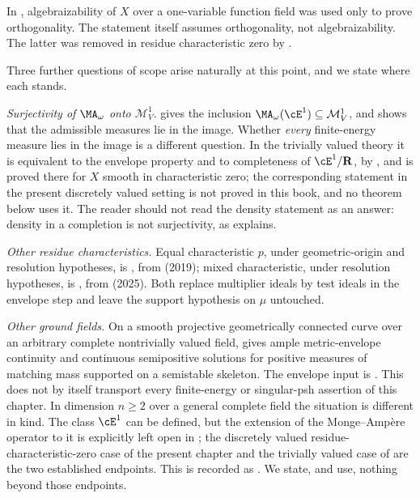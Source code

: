 In \cite{BFJ15}, algebraizability of \(X\) over a one-variable function
field was used only to prove orthogonality.  The statement
 itself assumes orthogonality, not
algebraizability.  The latter was removed in residue characteristic zero by
\cite[Theorem~6.3.3 and Corollary~6.3.4]{BGGJKM20}.

Three further questions of scope arise naturally at this point, and we state
where each stands.

\emph{Surjectivity of \(\MA_\omega\) onto \(\mathcal M^1_V\).}
 gives the inclusion
\(\MA_\omega(\cE^1)\subseteq\mathcal M^1_V\), and
 shows that the admissible measures lie
in the image.  Whether \emph{every} finite-energy measure lies in the image
is a different question.  In the trivially valued theory it is equivalent to
the envelope property and to completeness of \(\cE^1/\mathbf R\), by
\cite[Theorem~12.8]{BJ22}, and is proved there for \(X\) smooth in
characteristic zero; the corresponding statement in the present discretely
valued setting is not proved in this book, and no theorem below uses it.
The reader should not read the density statement
 as an answer: density in a
completion is not surjectivity, as
 explains.

\emph{Other residue characteristics.}  Equal characteristic \(p\), under
geometric-origin and resolution hypotheses, is
, from \cite{GJKM19} (2019);
mixed characteristic, under resolution hypotheses, is
, from \cite{FGK25} (2025).  Both
replace multiplier ideals by test ideals in the envelope step and leave the
support hypothesis on \(\mu\) untouched.

\emph{Other ground fields.}  On a smooth projective geometrically
connected curve over an arbitrary complete nontrivially valued field,
 gives ample metric-envelope
continuity and continuous semipositive solutions for positive measures of
matching mass supported on a semistable skeleton.  The envelope input is
\cite[Theorem~1.1]{GJKM19}.  This does not by itself transport every
finite-energy or singular-psh assertion of this chapter.
In dimension \(n\geq2\) over a
general complete field the situation is different in kind.  The class
\(\cE^1\) can be defined, but the extension of the Monge--Amp\`ere operator
to it is explicitly left open in \cite[Remark~4.4]{PS23Hybrid}; the
discretely valued residue-characteristic-zero case of the present chapter and
the trivially valued case of  are the two
established endpoints.  This is recorded as
.  We state, and use, nothing beyond those
endpoints.

